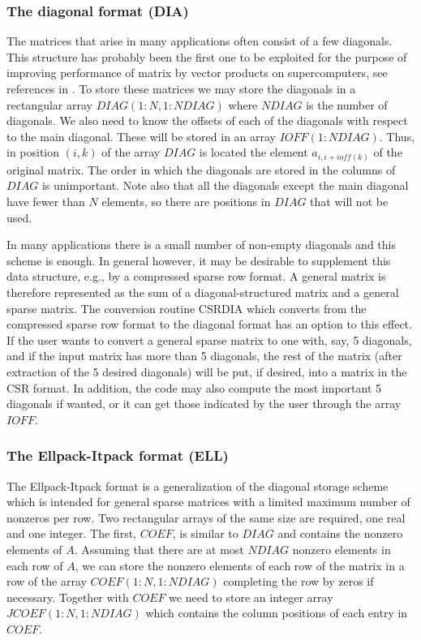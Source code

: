 \subsubsection{The diagonal format (DIA) }
The matrices that arise in many applications often consist of a few
diagonals. This structure has probably been the first one to be
exploited for the purpose of improving performance of
matrix by vector products on supercomputers, see references in
\cite{Saad-Boeing}.  To store
these matrices we may store the diagonals in a rectangular array
$DIAG(1:N,1:NDIAG) $ where $NDIAG$ is the number of diagonals.  We
also need to know the offsets of each of the diagonals with respect to
the main diagonal. These will be stored in an array $IOFF(1:NDIAG)$.
Thus, in position $(i,k)$ of the array $DIAG$ is located the element
$a_{i,i+ioff(k)}$ of the original matrix.  The order in which the
diagonals are stored in the columns of $DIAG$ is unimportant.  Note
also that all the diagonals except the main diagonal have fewer than
$N$ elements, so there are positions in $DIAG$ that will not be used.

In many applications there is a small number of non-empty diagonals
and this scheme is enough. In general however, it may be desirable to
supplement this data structure, e.g., by a compressed sparse row
format.  A general matrix is therefore represented as the sum of a
diagonal-structured matrix and a general sparse matrix.  The
conversion routine CSRDIA which converts from the compressed
sparse row format to the diagonal format has an option	 to this
effect.  If the user wants to convert a general sparse matrix to one
with, say, 5 diagonals, and if the input matrix has more than 5
diagonals, the rest of the matrix (after extraction of the 5 desired
diagonals) will be put, if desired, into a matrix in the CSR format.
In addition, the code may also compute the most important 5 diagonals
if wanted, or it can get those indicated by the user through the array
$IOFF$.

\subsubsection{The Ellpack-Itpack format (ELL) }
The Ellpack-Itpack format
\cite{Oppe-Kincaid,Young-Oppe-al,Oppe-NSPCG} is a 
generalization of the diagonal storage scheme which is intended for
general sparse matrices with a limited maximum number of nonzeros per
row. Two rectangular arrays of the same size are required, one real
and one integer.  The first, $COEF$, is similar to $DIAG$ and contains
the nonzero elements of $A$. Assuming that there are at most $NDIAG$
nonzero elements in each row of $A$, we can store the nonzero elements
of each row of the matrix in a row of the array $COEF(1:N,1:NDIAG)$
completing the row by zeros if necessary.  Together with $COEF$ we
need to store an integer array $JCOEF(1:N,1:NDIAG)$ which contains the
column positions of each entry in $COEF$.

